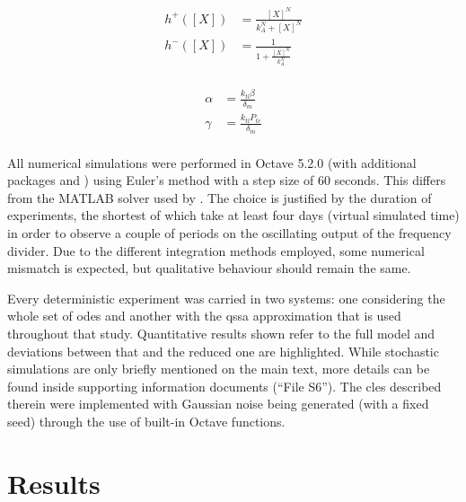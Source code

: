   \begin{multicols}{2}
    \begin{equation*}
      \begin{aligned}
        h^+([X]) &= \frac{[X]^N}{k_A^N + [X]^N} \\
        h^-([X]) &= \frac{1}{1 + \frac{[X]^N}{k_A^N}} \\
      \end{aligned}
    \end{equation*}

    \columnbreak

    \begin{equation*}
      \begin{aligned}
        \alpha &= \frac{k_{tl} \beta}{\delta_m} \\
        \gamma &= \frac{k_{tl} P_{tc}}{\delta_m} \\
      \end{aligned}
    \end{equation*}
  \end{multicols}

  All numerical simulations were performed in Octave 5.2.0 (with additional packages  and ) using Euler's method with a step size of $60$ seconds.
  This differs from the MATLAB  solver used by \citet{multif}.
  The choice is justified by the duration of experiments, the shortest of which take at least four days (virtual simulated time) in order to observe a couple of periods on the oscillating output of the frequency divider.
  Due to the different integration methods employed, some numerical mismatch is expected, but qualitative behaviour should remain the same.

  Every deterministic experiment was carried in two systems: one considering the whole set of \ac{ode}s and another with the \ac{qssa} approximation that is used throughout that study.
  Quantitative results shown refer to the full model and deviations between that and the reduced one are highlighted.
  While stochastic simulations are only briefly mentioned on the main text, more details can be found inside supporting information documents (``File S6'').
  The \ac{cles} described therein were implemented with Gaussian noise being generated (with a fixed seed) through the use of built-in Octave functions.


\section{Results}

